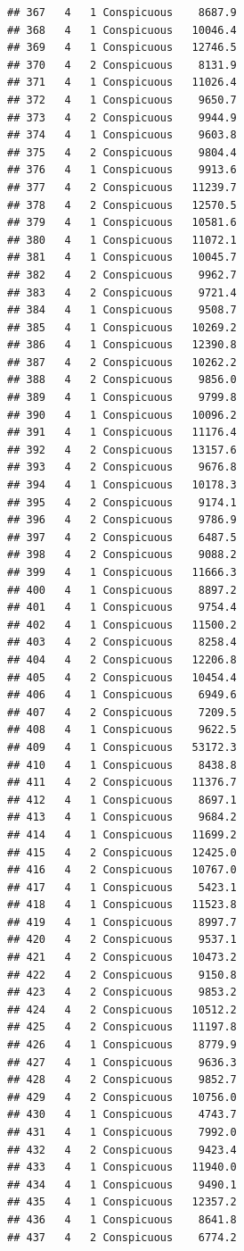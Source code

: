 \documentclass[12pt,]{krantz}
\theoremstyle{definition}
\theoremstyle{definition}
\theoremstyle{remark}
\begin{document}
\begin{verbatim}
## 367   4   1 Conspicuous    8687.9
## 368   4   1 Conspicuous   10046.4
## 369   4   1 Conspicuous   12746.5
## 370   4   2 Conspicuous    8131.9
## 371   4   1 Conspicuous   11026.4
## 372   4   1 Conspicuous    9650.7
## 373   4   2 Conspicuous    9944.9
## 374   4   1 Conspicuous    9603.8
## 375   4   2 Conspicuous    9804.4
## 376   4   1 Conspicuous    9913.6
## 377   4   2 Conspicuous   11239.7
## 378   4   2 Conspicuous   12570.5
## 379   4   1 Conspicuous   10581.6
## 380   4   1 Conspicuous   11072.1
## 381   4   1 Conspicuous   10045.7
## 382   4   2 Conspicuous    9962.7
## 383   4   2 Conspicuous    9721.4
## 384   4   1 Conspicuous    9508.7
## 385   4   1 Conspicuous   10269.2
## 386   4   1 Conspicuous   12390.8
## 387   4   2 Conspicuous   10262.2
## 388   4   2 Conspicuous    9856.0
## 389   4   1 Conspicuous    9799.8
## 390   4   1 Conspicuous   10096.2
## 391   4   1 Conspicuous   11176.4
## 392   4   2 Conspicuous   13157.6
## 393   4   2 Conspicuous    9676.8
## 394   4   1 Conspicuous   10178.3
## 395   4   2 Conspicuous    9174.1
## 396   4   2 Conspicuous    9786.9
## 397   4   2 Conspicuous    6487.5
## 398   4   2 Conspicuous    9088.2
## 399   4   1 Conspicuous   11666.3
## 400   4   1 Conspicuous    8897.2
## 401   4   1 Conspicuous    9754.4
## 402   4   1 Conspicuous   11500.2
## 403   4   2 Conspicuous    8258.4
## 404   4   2 Conspicuous   12206.8
## 405   4   2 Conspicuous   10454.4
## 406   4   1 Conspicuous    6949.6
## 407   4   2 Conspicuous    7209.5
## 408   4   1 Conspicuous    9622.5
## 409   4   1 Conspicuous   53172.3
## 410   4   1 Conspicuous    8438.8
## 411   4   2 Conspicuous   11376.7
## 412   4   1 Conspicuous    8697.1
## 413   4   1 Conspicuous    9684.2
## 414   4   1 Conspicuous   11699.2
## 415   4   2 Conspicuous   12425.0
## 416   4   2 Conspicuous   10767.0
## 417   4   1 Conspicuous    5423.1
## 418   4   1 Conspicuous   11523.8
## 419   4   1 Conspicuous    8997.7
## 420   4   2 Conspicuous    9537.1
## 421   4   2 Conspicuous   10473.2
## 422   4   2 Conspicuous    9150.8
## 423   4   2 Conspicuous    9853.2
## 424   4   2 Conspicuous   10512.2
## 425   4   2 Conspicuous   11197.8
## 426   4   1 Conspicuous    8779.9
## 427   4   1 Conspicuous    9636.3
## 428   4   2 Conspicuous    9852.7
## 429   4   2 Conspicuous   10756.0
## 430   4   1 Conspicuous    4743.7
## 431   4   1 Conspicuous    7992.0
## 432   4   2 Conspicuous    9423.4
## 433   4   1 Conspicuous   11940.0
## 434   4   1 Conspicuous    9490.1
## 435   4   1 Conspicuous   12357.2
## 436   4   1 Conspicuous    8641.8
## 437   4   2 Conspicuous    6774.2

\end{verbatim}
\end{document}
